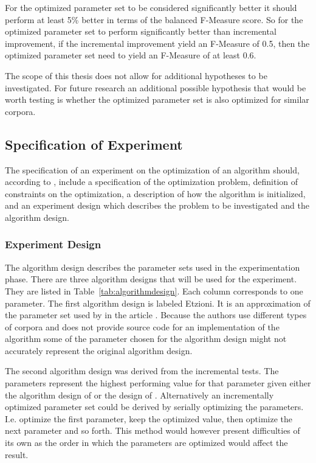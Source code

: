 \color{red}For the optimized parameter set to be considered significantly better it should perform at least 5\% better in terms of the balanced F-Measure score. So for the optimized parameter set to perform significantly better than incremental improvement, if the incremental improvement yield an F-Measure of 0.5, then the optimized parameter set need to yield an F-Measure of at least 0.6.
\color{black}

The scope of this thesis does not allow for additional hypotheses to be investigated. For future research an additional possible hypothesis that would be worth testing is whether the optimized parameter set is also optimized for similar corpora.

\subsection{Specification of Experiment}
The specification of an experiment on the optimization of an algorithm should, according to \citeauthor{Bartz-Beielstein2004}, include a specification of the optimization problem, definition of constraints on the optimization, a description of how the algorithm is initialized, and an experiment design which describes the problem to be investigated and the algorithm design.


\subsubsection{Experiment Design}
The algorithm design describes the parameter sets used in the experimentation phase. There are three algorithm designs that will be used for the experiment. They are listed in Table~\ref{tab:algorithmdesign}. Each column corresponds to one parameter. The first algorithm design is labeled Etzioni. It is an approximation of the parameter set used by \citeauthor{Oren1998} in the article . Because the authors use different types of corpora and does not provide source code for an implementation of the algorithm some of the parameter chosen for the algorithm design might not accurately represent the original algorithm design.

The second algorithm design was derived from the incremental tests. The parameters represent the highest performing value for that parameter given either the algorithm design of \citeauthor{Oren1998} or the design of \supervisor. Alternatively an incrementally optimized parameter set could be derived by serially optimizing the parameters. I.e. optimize the first parameter, keep the optimized value, then optimize the next parameter and so forth. This method would however present difficulties of its own as the order in which the parameters are optimized would affect the result.

